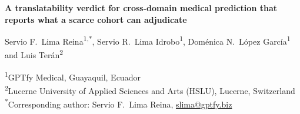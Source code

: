 \documentclass[12pt,a4paper]{article}
\newif\ifanon
\begin{document}
\thispagestyle{fancy}

\begin{center}
{\LARGE\bfseries A translatability verdict for cross-domain medical
prediction that reports what a scarce cohort can adjudicate\par}
\vspace{2ex}
\ifanon
{\large Authors and affiliations withheld for double-anonymised peer
review\par}
\else
{\large Servio F.~Lima Reina\textsuperscript{1,*},
Servio R.~Lima Idrobo\textsuperscript{1},
Dom\'enica N.~L\'opez Garc\'ia\textsuperscript{1} and
Luis Ter\'an\textsuperscript{2}\par}
\vspace{1.5ex}
{\small
\textsuperscript{1}GPTfy Medical, Guayaquil, Ecuador\\
\textsuperscript{2}Lucerne University of Applied Sciences and Arts (HSLU),
Lucerne, Switzerland\\[1ex]
\textsuperscript{*}Corresponding author: Servio F.~Lima Reina,
\href{mailto:slima@gptfy.biz}{slima@gptfy.biz}\par}
\fi
\end{center}
\vspace{2ex}




\FloatBarrier

\FloatBarrier

\FloatBarrier

\FloatBarrier

\FloatBarrier





\end{document}
